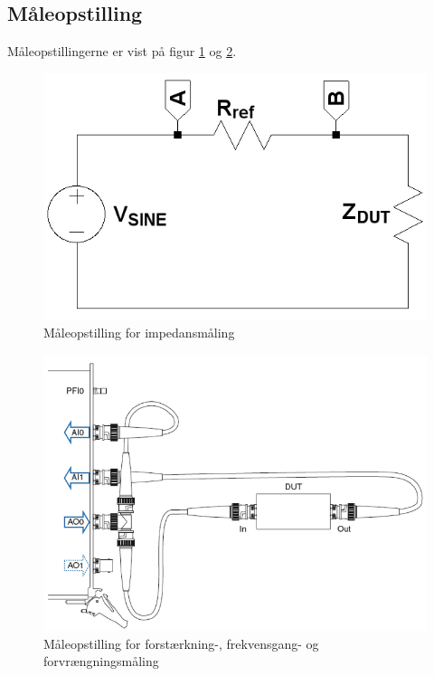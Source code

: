 \subsection*{Måleopstilling}
\label{maalejournal_maaleopstilling}
Måleopstillingerne er vist på figur \ref{fig:indgang:maaleop-imp} og \ref{fig:indgang:maaleop-thd}.

\begin{figure}[h]
\centering
\includegraphics[scale=0.4]{maalerapporter/forforstaerker/impedansopstilling-forforstaerker.png}
\caption{Måleopstilling for impedansmåling}
\label{fig:indgang:maaleop-imp}
\end{figure}

\begin{figure}[h]
\centering
\includegraphics[scale=0.4]{maalerapporter/indgangsvaelger/maaleopstilling-thd-forforstaerker.png}
\caption{Måleopstilling for forstærkning-, frekvensgang- og forvrængningsmåling \cite{maaling-mm5}}
\label{fig:indgang:maaleop-thd}
\end{figure}

